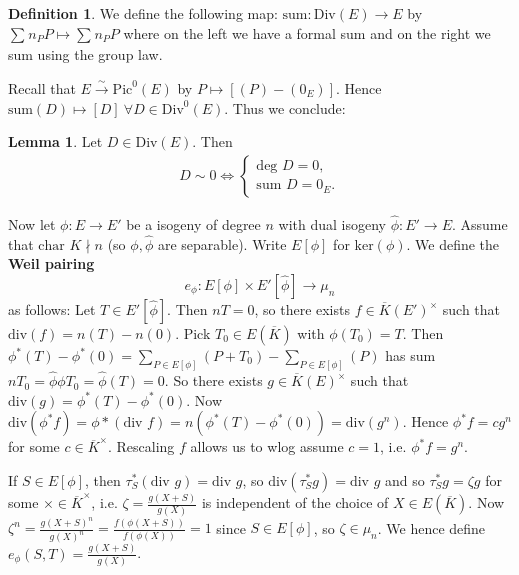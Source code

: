 \documentclass{article}
\theoremstyle{definition}
\newtheorem{lemma}[theorem]{Lemma}
\newtheorem{defn}{Definition}[section]
\begin{document}
\begin{defn}
    We define the following map: $\text{sum}: \text{Div}(E) \to E$ by $\sum_{}^{} n_P P \mapsto \sum_{}^{} n_P P$ where on the left we have a formal sum and on the right we sum using the group law.
\end{defn}
Recall that $E \stackrel{\sim}{\to} \text{Pic}^0(E)$ by $P\mapsto [(P)-(0_E)]$. Hence $\text{sum}(D) \mapsto [D] ~\forall D \in \text{Div}^0(E)$. Thus we conclude:
\begin{lemma}\label{lemma14.4}
    Let $D \in \text{Div}(E)$. Then 
    \begin{align*}
        D \sim 0 \iff \begin{cases}
            \text{deg }D = 0,\\
            \text{sum }D = 0_E.
        \end{cases}
    \end{align*}
\end{lemma}
Now let $\phi : E \to E'$ be a isogeny of degree $n$ with dual isogeny $\widehat{\phi} :E' \to E$. Assume that $\text{char }K \nmid n$ (so $\phi, \widehat{\phi}$ are separable). Write $E[\phi]$ for $\text{ker}(\phi)$. We define the \textbf{Weil pairing}
\[
e_{\phi} : E[\phi] \times E'[\widehat{\phi}] \to \mu_n
\]
as follows: Let $T \in E'[\widehat{\phi}]$. Then $nT = 0$, so there exists $f \in \overline{K}(E')^\times$ such that $\text{div}(f)=n(T)-n(0)$. Pick $T_0 \in E(\overline{K})$ with $\phi(T_0) = T$. Then $\phi^*(T)-\phi^*(0) = \sum_{P \in E[\phi]}^{} (P+T_0) - \sum_{P \in E[\phi]}^{} (P)$ has sum $nT_0 = \widehat{\phi}\phi T_0 = \widehat{\phi}(T) = 0$. So there exists $g \in \overline{K}(E)^\times$ such that $\text{div}(g)=\phi^*(T)-\phi^*(0)$. Now $\text{div}(\phi^* f) = \phi*(\text{div }f) = n(\phi^*(T)-\phi^*(0))=\text{div}(g^n)$. Hence $\phi^* f = cg^n$ for some $c \in \overline{K}^\times$. Rescaling $f$ allows us to wlog assume $c=1$, i.e. $\phi^* f = g^n$.
\vspace{1mm}
 
If $S \in E[\phi]$, then $\tau_S^*(\text{div }g)=\text{div }g$, so $\text{div}(\tau_S^* g) =\text{div }g$ and so $\tau_S^* g = \zeta g$ for some $\times \in \overline{K}^\times$, i.e. $\zeta = \frac{g(X+S)}{g(X)}$ is independent of the choice of $X \in E(\overline{K})$. Now $\zeta^n = \frac{g(X+S)^n}{g(X)^n} = \frac{f(\phi(X+S))}{f(\phi(X))} = 1$ since $S \in E[\phi]$, so $\zeta \in \mu_n$. We hence define $e_{\phi}(S,T) = \frac{g(X+S)}{g(X)}$.
\end{document}
